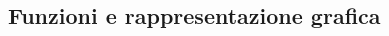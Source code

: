 \begin{questions}
\begin{qblock}
\begin{multicols}{2}
		\end{multicols}
	\end{qblock}

\end{questions}

\subsection{Funzioni e rappresentazione grafica}

